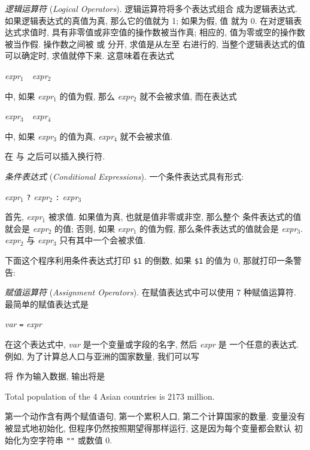 \emph{逻辑运算符} (\emph{Logical Operators}). 逻辑运算符将多个表达式组合
成为逻辑表达式. 如果逻辑表达式的真值为真, 那么它的值就为 1; 如果为假, 值
就为 0. 在对逻辑表达式求值时, 具有非零值或非空值的操作数被当作真; 相应的,
值为零或空的操作数被当作假. 操作数之间被 \AND  或 \OR 分开, 求值是从左至
右进行的, 当整个逻辑表达式的值可以确定时, 求值就停下来. 这意味着在表达式
\begin{pattern}
    \textit{expr}$_1$\ \AND\ \textit{expr}$_2$
\end{pattern}
中, 如果 \textit{expr}$_1$ 的值为假, 那么 \textit{expr}$_2$ 就不会被求值,
而在表达式
\begin{pattern}
    \textit{expr}$_3$\ \OR\ \textit{expr}$_4$
\end{pattern}
中, 如果 \textit{expr}$_3$  的值为真, \textit{expr}$_4$ 就不会被求值.

在 \AND  与 \OR 之后可以插入换行符.

\emph{条件表达式} (\emph{Conditional Expressions}). 一个条件表达式具有形式:
\begin{pattern}
    \textit{expr}$_1$ \verb'?' \textit{expr}$_2$ \verb':' \textit{expr}$_3$
\end{pattern}
首先, \textit{expr}$_1$ 被求值. 如果值为真, 也就是值非零或非空, 那么整个
条件表达式的值就会是 \textit{expr}$_2$ 的值; 否则, 如果 \textit{expr}$_1$
的值为假, 那么条件表达式的值就会是 \textit{expr}$_3$. \textit{expr}$_2$ 与
\textit{expr}$_3$ 只有其中一个会被求值.

下面这个程序利用条件表达式打印 \verb'$1' 的倒数, 如果 \verb'$1' 的值为 0,
那就打印一条警告:

\emph{赋值运算符} (\emph{Assignment Operators}). 在赋值表达式中可以使用 7
种赋值运算符. 最简单的赋值表达式是
\begin{pattern}
    \textit{var} \verb'=' \textit{expr}
\end{pattern}
在这个表达式中, \textit{var} 是一个变量或字段的名字, 然后 \textit{expr} 是
一个任意的表达式. 例如, 为了计算总人口与亚洲的国家数量, 我们可以写
将  作为输入数据, 输出将是
\begin{myverb}
    Total population of the 4 Asian countries is 2173 million.
\end{myverb}
第一个动作含有两个赋值语句, 第一个累积人口, 第二个计算国家的数量. 变量没有
被显式地初始化, 但程序仍然按照期望得那样运行, 这是因为每个变量都会默认
初始化为空字符串 \verb'""' 或数值 0.

